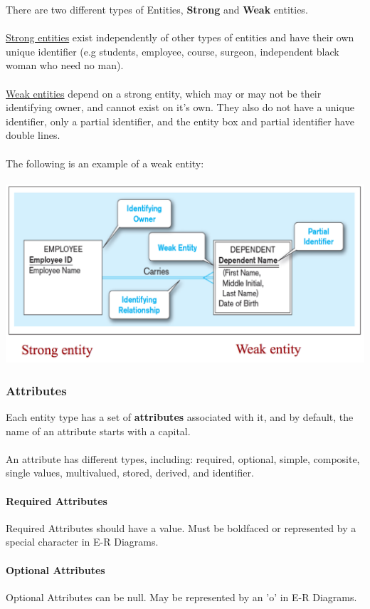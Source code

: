 \documentclass[12pt]{article}
\begin{document}
There are two different types of Entities, \textbf{Strong} and \textbf{Weak} entities.\\
\\
\underline{Strong entities} exist independently of other types of entities and have their own unique identifier (e.g students, employee, course, surgeon, independent black woman who need no man).\\
\\
\underline{Weak entities} depend on a strong entity, which may or may not be their identifying owner, and cannot exist on it's own. They also do not have a unique identifier, only a partial identifier, and the entity box and partial identifier have double lines.\\
\\
The following is an example of a weak entity:\\
\\
\includegraphics[scale=0.5]{lec2-4}

\subsubsection{Attributes}

Each entity type has a set of \textbf{attributes} associated with it, and by default, the name of an attribute starts with a capital.\\
\\
An attribute has different types, including: required, optional, simple, composite, single values, multivalued, stored, derived, and identifier.
\paragraph{Required Attributes} Required Attributes should have a value. Must be boldfaced or represented by a special character in E-R Diagrams.

\paragraph{Optional Attributes} Optional Attributes can be null. May be represented by an 'o' in E-R Diagrams.
\end{document}
